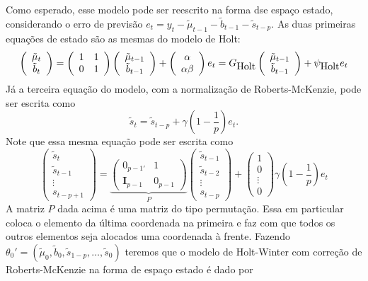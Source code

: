 \documentclass[
  letterpaper,
  DIV=11,
  numbers=noendperiod]{scrartcl}
\theoremstyle{definition}
\theoremstyle{definition}
\theoremstyle{plain}
\theoremstyle{plain}
\theoremstyle{remark}
\begin{document}
Como esperado, esse modelo pode ser reescrito na forma dse espaço
estado, considerando o erro de previsão
\(e_t=y_t-\tilde{\mu}_{t-1}-\tilde{b}_{t-1}-\tilde{s}_{t-p}\). As duas
primeiras equações de estado são as mesmas do modelo de Holt:
\[\left(\begin{array}{c} \tilde{\mu}_t \\ \tilde{b}_t\end{array}\right)=\left(\begin{array}{cc}1 & 1 \\ 0 & 1\end{array}\right)\left(\begin{array}{c} \tilde{\mu}_{t-1} \\ \tilde{b}_{t-1}\end{array}\right)+\left(\begin{array}{c} \alpha \\ \alpha\beta\end{array}\right)e_t=G_{\hbox{Holt}}\left(\begin{array}{c} \tilde{\mu}_{t-1} \\ \tilde{b}_{t-1}\end{array}\right)+\psi_{\hbox{Holt}}e_t\]
Já a terceira equação do modelo, com a normalização de Roberts-McKenzie,
pode ser escrita como
\[\tilde{s}_t=\tilde{s}_{t-p}+\gamma\left(1-\frac{1}{p}\right)e_t.\]
Note que essa mesma equação pode ser escrita como
\[\left(\begin{array}{c}\tilde{s}_t\\ \tilde{s}_{t-1} \\ \vdots \\ s_{t-p+1}\end{array}\right)=\underbrace{\left(\begin{array}{c} 0_{p-1'} & 1 \\ \textbf{I}_{p-1} & 0_{p-1} \end{array}\right)}_{P}\left(\begin{array}{c}\tilde{s}_{t-1}\\ \tilde{s}_{t-2} \\ \vdots \\ s_{t-p}\end{array}\right)+\left(\begin{array}{c}1\\ 0 \\ \vdots \\ 0\end{array}\right)\gamma\left(1-\frac{1}{p}\right) e_t\]
A matriz \(P\) dada acima é uma matriz do tipo permutação. Essa em
particular coloca o elemento da última coordenada na primeira e faz com
que todos os outros elementos seja alocados uma coordenada à frente.
Fazendo
\(\theta_0'=(\tilde{\mu}_0,\tilde{b}_0,\tilde{s}_{1-p},\ldots,\tilde{s}_0)\)
teremos que o modelo de Holt-Winter com correção de Roberts-McKenzie na
forma de espaço estado é dado por
\end{document}
